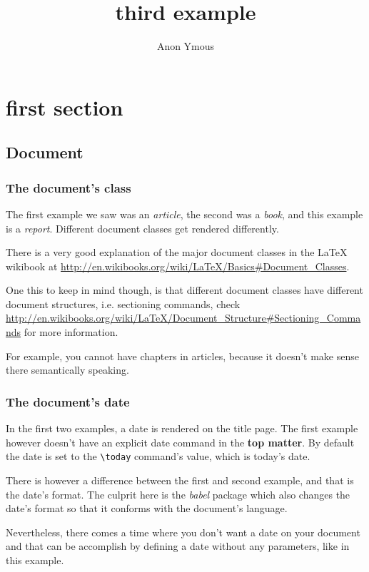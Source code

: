 \documentclass[a4paper]{report}
\author{Anon Ymous}
\date{}
\title{third example}
\begin{document}
\maketitle

\tableofcontents

\chapter{first section}

\section{Document}

\subsection{The document's class}

The first example we saw was an \textit{article}, the second was a
\textit{book}, and this example is a \textit{report}.
Different document classes get rendered differently.

There is a very good explanation of the major document classes in the LaTeX
wikibook at \url{http://en.wikibooks.org/wiki/LaTeX/Basics#Document_Classes}.

One this to keep in mind though, is that different document classes have
different document structures, i.e. sectioning commands, check
\url{http://en.wikibooks.org/wiki/LaTeX/Document_Structure#Sectioning_Commands}
for more information.

For example, you cannot have chapters in articles, because it doesn't make
sense there semantically speaking.


\subsection{The document's date}

In the first two examples, a date is rendered on the title page. The first
example however doesn't have an explicit date command in the
\textbf{top matter}.
By default the date is set to the \verb`\today` command's value, which is
today's date.

There is however a difference between the first and second example, and that is
the date's format. The culprit here is the \textit{babel} package which also
changes the date's format so that it conforms with the document's language.

Nevertheless, there comes a time where you don't want a date on your document
and that can be accomplish by defining a date without any parameters, like in
this example.
\end{document}
